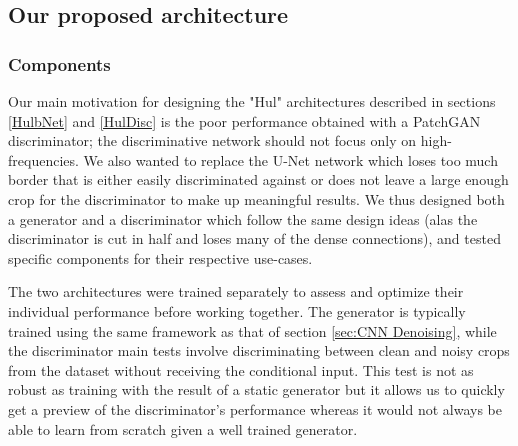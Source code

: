 \subsection{Our proposed architecture}
\subsubsection{Components}\label{sec:Components}
Our main motivation for designing the "Hul" architectures described in sections \ref{HulbNet} and \ref{HulDisc} is the poor performance obtained with a PatchGAN discriminator; the discriminative network should not focus only on high-frequencies. We also wanted to replace the U-Net network which loses too much border that is either easily discriminated against or does not leave a large enough crop for the discriminator to make up meaningful results. We thus designed both a generator and a discriminator which follow the same design ideas (alas the discriminator is cut in half and loses many of the dense connections), and tested specific components for their respective use-cases.


The two architectures were trained separately to assess and optimize their individual performance before working together. The generator is typically trained using the same framework as that of section \ref{sec:CNN Denoising}, while the discriminator main tests involve discriminating between clean and noisy crops from the dataset without receiving the conditional input. This test is not as robust as training with the result of a static generator but it allows us to quickly get a preview of the discriminator's performance whereas it would not always be able to learn from scratch given a well trained generator.

